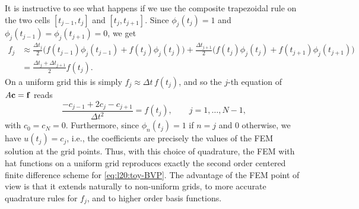 It is instructive to see what happens if we use the composite 
trapezoidal rule on the two cells $[t_{j-1}, t_j]$ and $[t_j, t_{j+1}]$. 
Since $\phi_j(t_j) = 1$ and $\phi_j(t_{j-1}) = \phi_j(t_{j+1}) = 0$, we get 
\begin{equation*}
    \begin{aligned}
    f_j & \approx \frac{\Delta t_j}{2} \Big( f(t_{j-1}) \phi_j(t_{j-1}) + f(t_j) \phi_j(t_j) \Big) 
    + \frac{\Delta t_{j+1}}{2} \Big( f(t_j) \phi_j(t_j) + f(t_{j+1}) \phi_j(t_{j+1}) \Big) \\
    & = \frac{\Delta t_j + \Delta t_{j+1}}{2} f(t_j).
    \end{aligned}
\end{equation*}
On a uniform grid this is simply $f_j \approx \Delta t \, f(t_j)$, and so the 
$j$-th equation of $A \mathbf{c} = \mathbf{f}$ reads 
\begin{equation*}
    \frac{-c_{j-1} + 2 c_j - c_{j+1}}{\Delta t^2} = f(t_j), \qquad j = 1, \dots, N-1,
\end{equation*}
with $c_0 = c_N = 0$. Furthermore, since $\phi_n(t_j) = 1$ if $n = j$ and 
$0$ otherwise, we have $u(t_j) = c_j$, i.e., the coefficients are 
precisely the values of the FEM solution at the grid points. 
Thus, with this choice of quadrature, the FEM with hat functions 
on a uniform grid reproduces exactly the second order centered 
finite difference scheme for \eqref{eq:l20:toy-BVP}. The advantage of 
the FEM point of view is that it extends naturally to non-uniform 
grids, to more accurate quadrature rules for $f_j$, and to 
higher order basis functions. 


% 
% 